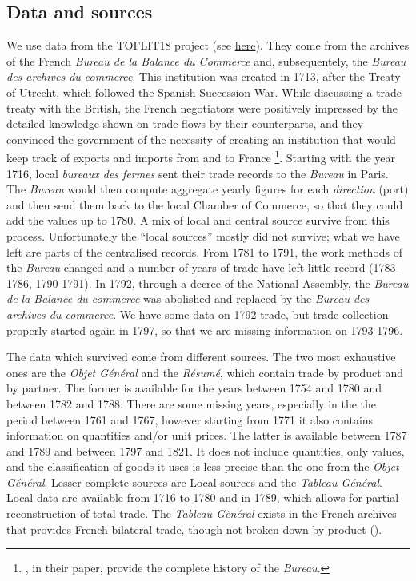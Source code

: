 \documentclass[12pt,a4paper,notitlepage,english]{article}
\begin{document}
\begin{appendix}

\section{Data and sources} \label{sec:dataset}
We use data from the TOFLIT18 project (see \href{http://toflit18.medialab.sciences-po.fr/\#/home}{here}). They come from the archives of the French \textit{Bureau de la Balance du Commerce} and, subsequentely, the \textit{Bureau des archives du commerce}.
This institution was created in 1713, after the Treaty of Utrecht, which followed the Spanish Succession War.
While discussing a trade treaty with the British, the French negotiators were positively impressed by the detailed knowledge shown on trade flows by their counterparts, and they convinced the government of the necessity of creating an institution that would keep track of exports and imports from and to France \citep{Charles2011}\footnote{\cite{Charles2011}, in their paper, provide the complete history of the \textit{Bureau}.}.
Starting with the year 1716, local \textit{bureaux des fermes} sent their trade records to the \textit{Bureau} in Paris.
The \textit{Bureau} would then compute aggregate yearly figures for each \textit{direction} (port) and then send them back to the local Chamber of Commerce, so that they could add the values up to 1780.
A mix of local and central source survive from this process. Unfortunately the ``local sources'' mostly did not survive; what we have left are parts of the centralised records.
From 1781 to 1791, the work methods of the \textit{Bureau} changed and a number of years of trade have left little record (1783-1786, 1790-1791).
In 1792, through a decree of the National Assembly, the \textit{Bureau de la Balance du commerce} was abolished and replaced by the \textit{Bureau des archives du commerce}. We have some data on 1792 trade, but trade collection properly started again in 1797, so that we are missing information on 1793-1796.

The data which survived come from different sources.
The two most exhaustive ones are the \textit{Objet Général} and the \textit{Résumé}, which contain trade by product and by partner. 
The former is available for the years between 1754 and 1780 and between 1782 and 1788. There are some missing years, especially in the the period between 1761 and 1767, however starting from 1771 it also contains information on quantities and/or unit prices.
The latter is available between 1787 and 1789 and between 1797 and 1821. It does not include quantities, only values, and the classification of goods it uses is less precise than the one from the \textit{Objet Général}.
Lesser complete sources are Local sources and the \textit{Tableau Général}. Local data are available from 1716 to 1780 and in 1789, which allows for partial reconstruction of total trade.
The \textit{Tableau Général} exists in the French archives that provides French bilateral trade, though not broken down by product (\cite{Romano1957}). 


\end{appendix}
\end{document}
